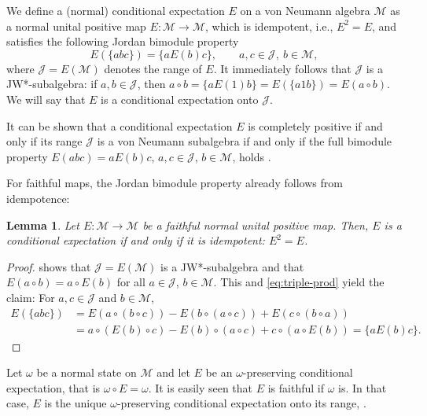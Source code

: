 \documentclass[12pt]{article}
\def\Me{\mathcal M}
\def\Je{\mathcal J}
\newtheorem{lemma}{Lemma}
\theoremstyle{definition}
\theoremstyle{remark}
\begin{document}
We define a (normal) conditional expectation $E$ on a von Neumann algebra $\Me$ as a normal unital positive map $E:\Me \to \Me$, which is idempotent, i.e., $E^2=E$, and satisfies the following Jordan bimodule property
\begin{equation}\label{eq:J-bimodule}
    E(\{abc\}) = \{aE(b)c\}, \qquad a,c \in \Je,\ b \in \Me,
\end{equation}
where $\Je = E(\Me)$ denotes the range of $E$.
It immediately follows that $\Je$ is a JW*-subalgebra: 
if $a,b \in \Je$, then $a\circ b = \{aE(1)b\} = E(\{a1b\}) = E(a\circ b)$.
We will say that $E$ is a conditional expectation onto $\Je$.

It can be shown that a conditional expectation $E$ is completely positive if and only if its range $\Je$ is a von Neumann subalgebra if and only if the full bimodule property $E(abc)=aE(b)c$, $a,c\in \Je$, $b\in \Me$, holds \cite{tomiyama_projection_1957,choi_schwarz_1974}.

For faithful maps, the Jordan bimodule property already follows from idempotence:

\begin{lemma}
    Let $E:\Me\to \Me$ be a faithful normal unital positive map.
    Then, $E$ is a conditional expectation if and only if it is idempotent: $E^2=E$.
\end{lemma}

\begin{proof}
    \cite[Prop.~3.21]{arhancet_positive_2023} shows that $\Je = E(\Me)$ is a JW*-subalgebra and that $E(a\circ b)=a\circ E(b)$ for all $a\in\Je$, $b\in\Me$.
    This and \eqref{eq:triple-prod} yield the claim: 
    For $a,c\in\Je$ and $b\in\Me$,
    \begin{align*}
        E(\{abc\}) 
        &= E(a\circ(b\circ c))- E(b\circ (a\circ c)) + E(c\circ (b\circ a))\\
        &=a \circ (E(b)\circ c) - E(b)\circ(a\circ c) + c \circ (a\circ E(b)) 
        = \{aE(b)c\}.
    \end{align*}
    
\end{proof}


Let $\omega$ be a normal state on $\Me$ and let $E$ be an $\omega$-preserving  conditional
expectation, that is $\omega\circ E=\omega$. It is easily seen that $E$ is faithful if  $\omega$ is.
In that case, $E$ is the unique $\omega$-preserving conditional expectation onto its
range,  \cite[Lemma 1]{luczak2021some}.
\end{document}
